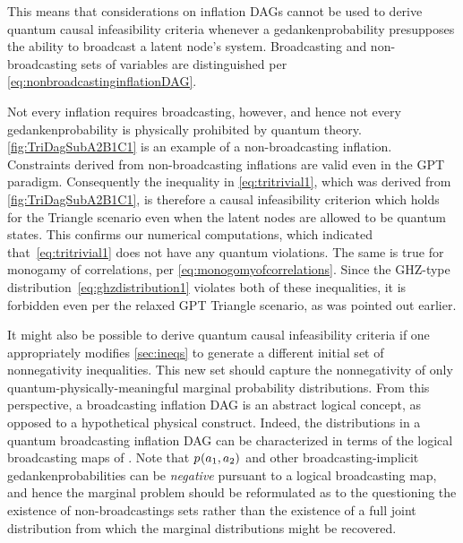 This means that considerations on inflation DAGs cannot be used to derive quantum causal infeasibility criteria whenever a gedankenprobability presupposes the ability to broadcast a latent node's system. Broadcasting and non-broadcasting sets of variables are distinguished per \cref{eq:nonbroadcastinginflationDAG}.


Not every inflation requires broadcasting, however, and hence not every gedankenprobability is physically prohibited by quantum theory. 
\cref{fig:TriDagSubA2B1C1} is an example of a non-broadcasting inflation.
Constraints derived from non-broadcasting inflations are valid even in the GPT paradigm. Consequently the inequality in \cref{eq:tritrivial1}, which was derived from \cref{fig:TriDagSubA2B1C1}, is therefore a causal infeasibility criterion which holds for the Triangle scenario even when the latent nodes are allowed to be quantum states. This confirms our numerical computations, which indicated that~\eqref{eq:tritrivial1} does not have any quantum violations. The same is true for monogamy of correlations, per \cref{eq:monogomyofcorrelations}. Since the GHZ-type distribution~\cref{eq:ghzdistribution1} violates both of these inequalities, it is forbidden even per the relaxed GPT Triangle scenario, as was pointed out earlier. 

It might also be possible to derive quantum causal infeasibility criteria if one appropriately modifies \cref{sec:ineqs} to generate a different initial set of nonnegativity inequalities. This new set should capture the nonnegativity of only quantum-physically-meaningful marginal probability distributions. From this perspective, a broadcasting inflation DAG is an abstract logical concept, as opposed to a hypothetical physical construct. Indeed, the distributions in a quantum broadcasting inflation DAG can be characterized in terms of the logical broadcasting maps of \citet{Coecke2011}. Note that ${p_{}}\lparen a_1,a_2\rparen$ and other broadcasting-implicit gedankenprobabilities can be \emph{negative} pursuant to a logical broadcasting map, and hence the marginal problem should be reformulated as to the questioning the existence of non-broadcastings sets rather than the existence of a full joint distribution from which the marginal distributions might be recovered.

